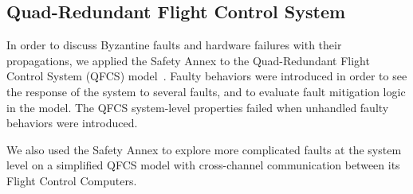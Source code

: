 

\subsection{Quad-Redundant Flight Control System}
In order to discuss Byzantine faults and hardware failures with their propagations, we applied the Safety Annex to the Quad-Redundant Flight Control System (QFCS) model~\cite{QFCS15:backes}. Faulty behaviors were introduced in order to see the response of the system to several faults, and to evaluate fault mitigation logic in the model. The QFCS system-level properties failed when unhandled faulty behaviors were introduced.

We also used the Safety Annex to explore more complicated faults at the system level on a simplified QFCS model with cross-channel communication between its Flight Control Computers.

